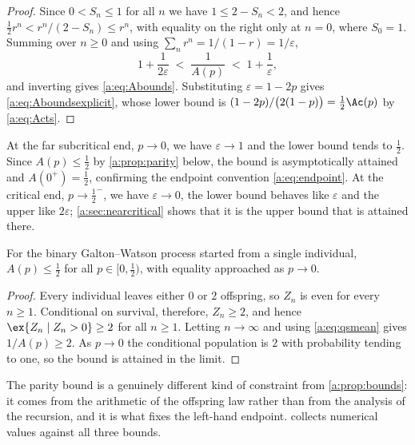 \begin{proof}
Since $0<S_n\le1$ for all $n$ we have $1\le2-S_n<2$, and hence
$\tfrac12r^n < r^n/(2-S_n)\le r^n$, with equality on the right only at $n=0$, where
$S_0=1$. Summing over $n\ge0$ and using $\sum_nr^n = 1/(1-r) = 1/\varepsilon$,
\begin{equation*}
1+\frac{1}{2\varepsilon} \;<\; \frac{1}{A(p)} \;<\; 1+\frac{1}{\varepsilon},
\end{equation*}
and inverting gives \cref{a:eq:Abounds}. Substituting $\varepsilon=1-2p$ gives
\cref{a:eq:Aboundsexplicit}, whose lower bound is
$(1-2p)/\bigl(2(1-p)\bigr) = \tfrac12\Ac(p)$ by \cref{a:eq:Acts}.
\end{proof}

At the far subcritical end, $p\to0$, we have $\varepsilon\to1$ and the lower bound
tends to $\tfrac12$. Since $A(p)\le\tfrac12$ by \cref{a:prop:parity} below, the
bound is asymptotically attained and $A(0^+)=\tfrac12$, confirming the endpoint
convention \cref{a:eq:endpoint}. At the critical end, $p\to\tfrac12^-$, we have
$\varepsilon\to0$, the lower bound behaves like $\varepsilon$ and the upper like
$2\varepsilon$; \cref{a:sec:nearcritical} shows that it is the upper bound that is
attained there.

\begin{proposition}
\label{a:prop:parity}
For the binary Galton--Watson process started from a single individual,
$A(p)\le\tfrac12$ for all $p\in[0,\tfrac12)$, with equality approached as $p\to0$.
\end{proposition}

\begin{proof}
Every individual leaves either $0$ or $2$ offspring, so $Z_n$ is even for every
$n\ge1$. Conditional on survival, therefore, $Z_n\ge2$, and hence
$\ex{Z_n\mid Z_n>0}\ge2$ for all $n\ge1$. Letting $n\to\infty$ and using
\cref{a:eq:qsmean} gives $1/A(p)\ge2$. As $p\to0$ the conditional population is $2$
with probability tending to one, so the bound is attained in the limit.
\end{proof}

The parity bound is a genuinely different kind of constraint from
\cref{a:prop:bounds}: it comes from the arithmetic of the offspring law rather than
from the analysis of the recursion, and it is what fixes the left-hand endpoint.
 collects numerical values against all three bounds.

